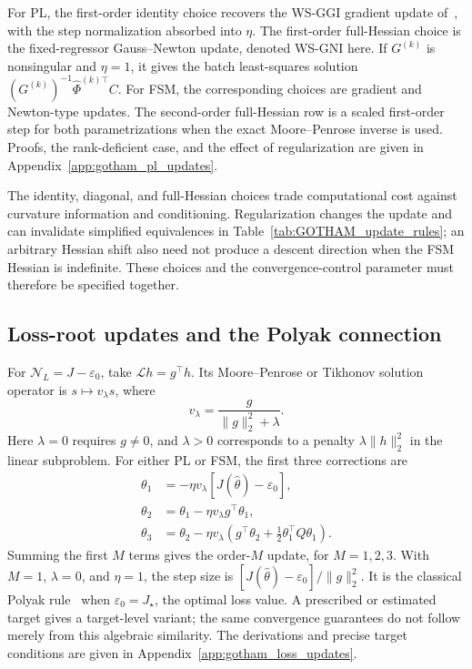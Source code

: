 For PL, the first-order identity choice recovers the WS-GGI gradient
update of~\cite{Lv2026}, with the step normalization absorbed into $\eta$.
The first-order full-Hessian choice is the fixed-regressor
Gauss--Newton update, denoted WS-GNI here. If $G^{(k)}$ is nonsingular
and $\eta=1$, it gives the batch least-squares solution
$(G^{(k)})^{-1}\hat\Phi^{(k)\top}C$. For FSM, the corresponding choices
are gradient and Newton-type updates. The second-order full-Hessian
row is a scaled first-order step for both parametrizations when the
exact Moore--Penrose inverse is used. Proofs, the rank-deficient case,
and the effect of regularization are given in
Appendix~\ref{app:gotham_pl_updates}.

\begin{remark}
The identity, diagonal, and full-Hessian choices trade computational cost
against curvature information and conditioning. Regularization changes
the update and can invalidate simplified equivalences in
Table~\ref{tab:GOTHAM_update_rules}; an arbitrary Hessian shift also need
not produce a descent direction when the FSM Hessian is indefinite.
These choices and the convergence-control parameter must therefore be
specified together.
\end{remark}

\subsection{Loss-root updates and the Polyak connection}
\label{subsec:GOTHAM_PL_loss_root}

For $\mathcal N_L=J-\varepsilon_0$, take
$\mathcal Lh=g^\top h$. Its Moore--Penrose or Tikhonov solution
operator is $s\mapsto v_\lambda s$, where
\begin{equation}
\label{eq:GOTHAM_common_loss_inverse}
    v_\lambda=\frac{g}{\|g\|_2^2+\lambda}.
\end{equation}
Here $\lambda=0$ requires $g\ne0$, and $\lambda>0$ corresponds to
a penalty $\lambda\|h\|_2^2$ in the linear subproblem. For either PL or
FSM, the first three corrections are
\begin{equation}
\label{eq:GOTHAM_common_loss_corrections}
\begin{aligned}
    \theta_1&=-\eta v_\lambda[J(\hat\theta)-\varepsilon_0],\\
    \theta_2&=\theta_1-\eta v_\lambda g^\top\theta_1,\\
    \theta_3&=\theta_2-\eta v_\lambda
       \left(g^\top\theta_2+\tfrac12\theta_1^\top Q\theta_1\right).
\end{aligned}
\end{equation}
Summing the first $M$ terms gives the order-$M$ update, for $M=1,2,3$.
With $M=1$, $\lambda=0$, and $\eta=1$, the step size is
$[J(\hat\theta)-\varepsilon_0]/\|g\|_2^2$. It is the classical
Polyak rule~\cite{Polyak1969} when $\varepsilon_0=J_\star$, the optimal
loss value. A prescribed or estimated target gives a target-level variant;
the same convergence guarantees do not follow merely from this algebraic
similarity. The derivations and precise target conditions are given in
Appendix~\ref{app:gotham_loss_updates}.

